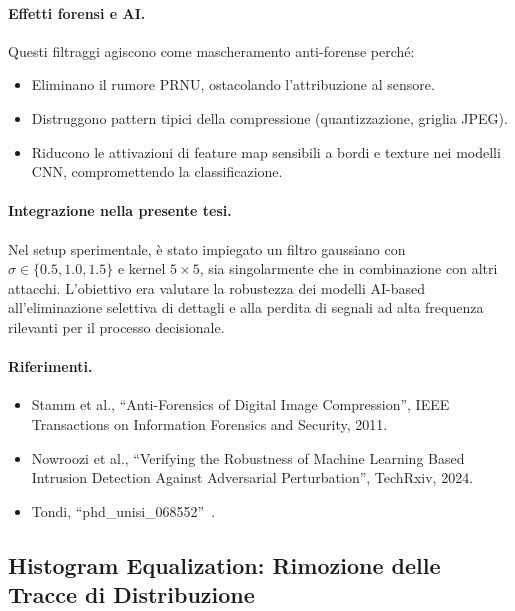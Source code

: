 \paragraph{Effetti forensi e AI.}
Questi filtraggi agiscono come mascheramento anti-forense perché:
\begin{itemize}
    \item Eliminano il rumore PRNU, ostacolando l’attribuzione al sensore.
    \item Distruggono pattern tipici della compressione (quantizzazione, griglia JPEG).
    \item Riducono le attivazioni di feature map sensibili a bordi e texture nei modelli CNN, compromettendo la classificazione.
\end{itemize}

\paragraph{Integrazione nella presente tesi.}
Nel setup sperimentale, è stato impiegato un filtro gaussiano con $\sigma \in \{0.5, 1.0, 1.5\}$ e kernel $5 \times 5$, sia singolarmente che in combinazione con altri attacchi. L’obiettivo era valutare la robustezza dei modelli AI-based all’eliminazione selettiva di dettagli e alla perdita di segnali ad alta frequenza rilevanti per il processo decisionale.

\paragraph{Riferimenti.}
\begin{itemize}
    \item Stamm et al., “Anti-Forensics of Digital Image Compression”, IEEE Transactions on Information Forensics and Security, 2011.
    \item Nowroozi et al., “Verifying the Robustness of Machine Learning Based Intrusion Detection Against Adversarial Perturbation”, TechRxiv, 2024.
    \item Tondi, “phd\_unisi\_068552”~\cite{phd_unisi_068552}.
\end{itemize}





\subsection{Histogram Equalization: Rimozione delle Tracce di Distribuzione}
\label{sec:histogram_equalization}

